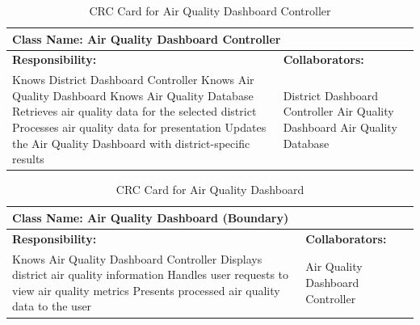 \documentclass[]{article}
\begin{document}
\begin{table}[H]
    \centering
    \caption{CRC Card for Air Quality Dashboard Controller}
    \vspace{1mm}
    \begin{tabular}{|p{7.5cm}|p{7.5cm}|}
    \hline 
    \multicolumn{2}{|l|}{\textbf{Class Name: Air Quality Dashboard Controller}} \\
    \hline
    \textbf{Responsibility:} & \textbf{Collaborators:} \\
    \hline
        Knows District Dashboard Controller \newline
        Knows Air Quality Dashboard \newline
        Knows Air Quality Database \newline
        Retrieves air quality data for the selected district \newline
        Processes air quality data for presentation \newline
        Updates the Air Quality Dashboard with district-specific results \newline
        &
        District Dashboard Controller \newline
        Air Quality Dashboard \newline
        Air Quality Database \\
    \hline
    \end{tabular}
\end{table}
\begin{table}[H]
    \centering
    \caption{CRC Card for Air Quality Dashboard}
    \vspace{1mm}
    \begin{tabular}{|p{7.5cm}|p{7.5cm}|}
    \hline 
    \multicolumn{2}{|l|}{\textbf{Class Name: Air Quality Dashboard (Boundary)}} \\
    \hline
    \textbf{Responsibility:} & \textbf{Collaborators:} \\
    \hline
        Knows Air Quality Dashboard Controller \newline
        Displays district air quality information \newline
        Handles user requests to view air quality metrics \newline
        Presents processed air quality data to the user \newline
        &
        Air Quality Dashboard Controller \\
    \hline
    \end{tabular}
\end{table}
\end{document}
